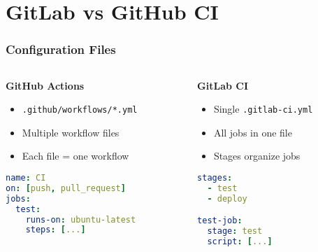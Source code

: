 \section{GitLab vs GitHub CI}
{   
}

\begin{frame}[fragile]
	\frametitle{Configuration Files}
	\begin{columns}
		\begin{column}{0.5\textwidth}
			\textbf{GitHub Actions}
			\begin{itemize}
				\item \texttt{.github/workflows/*.yml}
				\item Multiple workflow files
				\item Each file = one workflow
			\end{itemize}
			\begin{lstlisting}[language=yaml, style=Shell]
name: CI
on: [push, pull_request]
jobs:
  test:
    runs-on: ubuntu-latest
    steps: [...]
			\end{lstlisting}
		\end{column}
		\begin{column}{0.5\textwidth}
			\textbf{GitLab CI}
			\begin{itemize}
				\item Single \texttt{.gitlab-ci.yml}
				\item All jobs in one file
				\item Stages organize jobs
			\end{itemize}
			\begin{lstlisting}[language=yaml, style=Shell]
stages:
  - test
  - deploy

test-job:
  stage: test
  script: [...]
			\end{lstlisting}
		\end{column}
	\end{columns}
\end{frame}

